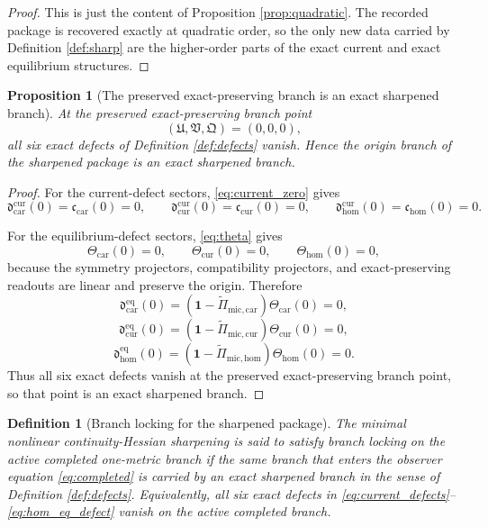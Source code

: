 \documentclass[11pt]{article}
\newcommand{\RootTensor}{\mathfrak U}
\newcommand{\RootRelabel}{\mathfrak V}
\newcommand{\RootFree}{\mathfrak Q}
\newcommand{\TensorCurrent}{\mathfrak c_{\mathrm{car}}}
\newcommand{\CurCurrent}{\mathfrak c_{\mathrm{cur}}}
\newcommand{\HomCurrent}{\mathfrak c_{\mathrm{hom}}}
\newcommand{\TensorEqKerProj}{\widetilde\Pi_{\mathrm{mic,car}}}
\newcommand{\CurEqKerProj}{\widetilde\Pi_{\mathrm{mic,cur}}}
\newcommand{\HomEqKerProj}{\widetilde\Pi_{\mathrm{mic,hom}}}
\newcommand{\TensorTheta}{\Theta_{\mathrm{car}}}
\newcommand{\CurTheta}{\Theta_{\mathrm{cur}}}
\newcommand{\HomTheta}{\Theta_{\mathrm{hom}}}
\newtheorem{definition}{Definition}
\newtheorem{proposition}{Proposition}
\begin{document}
\begin{proof}
This is just the content of Proposition \ref{prop:quadratic}. The recorded package is recovered exactly at quadratic order, so the only new data carried by Definition \ref{def:sharp} are the higher-order parts of the exact current and exact equilibrium structures.
\end{proof}

\begin{proposition}[The preserved exact-preserving branch is an exact sharpened branch]
\label{prop:origin_exact}
At the preserved exact-preserving branch point
\[
(\RootTensor,\RootRelabel,\RootFree)=(0,0,0),
\]
all six exact defects of Definition \ref{def:defects} vanish. Hence the origin branch of the sharpened package is an exact sharpened branch.
\end{proposition}

\begin{proof}
For the current-defect sectors, \eqref{eq:current_zero} gives
\[
\mathfrak d_{\mathrm{car}}^{\mathrm{cur}}(0)=\TensorCurrent(0)=0,\qquad
\mathfrak d_{\mathrm{cur}}^{\mathrm{cur}}(0)=\CurCurrent(0)=0,\qquad
\mathfrak d_{\mathrm{hom}}^{\mathrm{cur}}(0)=\HomCurrent(0)=0.
\]

For the equilibrium-defect sectors, \eqref{eq:theta} gives
\[
\TensorTheta(0)=0,\qquad
\CurTheta(0)=0,\qquad
\HomTheta(0)=0,
\]
because the symmetry projectors, compatibility projectors, and exact-preserving readouts are linear and preserve the origin. Therefore
\[
\mathfrak d_{\mathrm{car}}^{\mathrm{eq}}(0)
=(\mathbf 1-\TensorEqKerProj)\TensorTheta(0)=0,
\]
\[
\mathfrak d_{\mathrm{cur}}^{\mathrm{eq}}(0)
=(\mathbf 1-\CurEqKerProj)\CurTheta(0)=0,
\]
\[
\mathfrak d_{\mathrm{hom}}^{\mathrm{eq}}(0)
=(\mathbf 1-\HomEqKerProj)\HomTheta(0)=0.
\]
Thus all six exact defects vanish at the preserved exact-preserving branch point, so that point is an exact sharpened branch.
\end{proof}

\begin{definition}[Branch locking for the sharpened package]
\label{def:locking}
The minimal nonlinear continuity-Hessian sharpening is said to satisfy \emph{branch locking} on the active completed one-metric branch if the same branch that enters the observer equation \eqref{eq:completed} is carried by an exact sharpened branch in the sense of Definition \ref{def:defects}. Equivalently, all six exact defects in \eqref{eq:current_defects}--\eqref{eq:hom_eq_defect} vanish on the active completed branch.
\end{definition}
\end{document}
